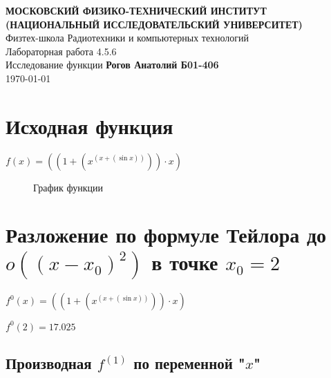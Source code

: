 \documentclass[12pt, letterpaper]{report}
\begin{document}
\begin{titlepage}
\begin{center}
\vspace*{1cm}
\textbf{МОСКОВСКИЙ ФИЗИКО-ТЕХНИЧЕСКИЙ ИНСТИТУТ (НАЦИОНАЛЬНЫЙ ИССЛЕДОВАТЕЛЬСКИЙ УНИВЕРСИТЕТ)}\\
\vspace{0.5cm} Физтех-школа Радиотехники и компьютерных технологий\\
\vspace{5cm} \LARGE{Лабораторная работа 4.5.6\\
Исследование функции}
\vfill
\large{\textbf{Рогов Анатолий Б01-406}} \\
\large \today
\vspace{0.8cm}
\end{center}
\end{titlepage}
\chapter{Исходная функция}
\hfil $f(x) = ({({1}+{({x}^{({x}+{(\sin{x})})})})}\cdot{x})$\\
\begin{figure}[h]
\centering
{}
\caption{График функции}
\end{figure}
\chapter{Разложение по формуле Тейлора до \\ $o((x - x_0)^{2})$ в точке $x_0 = 2$}
\begin{center} $f^{0}(x) = ({({1}+{({x}^{({x}+{(\sin{x})})})})}\cdot{x})$ \end{center}
\begin{center} $f^{0}(2) = 17.025$ \end{center}
\section{Производная $f^{(1)}$ по переменной "$x$"}
\renewcommand{\thesubsection}{\arabic{subsection}}
\titleformat{\subsection}{\normalfont\bfseries}{}{0em}{#1\ \thesubsection}
\end{document}
